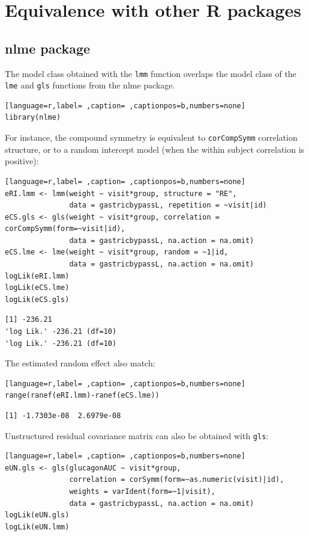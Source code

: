 \documentclass[12pt]{article}
\begin{document}
\clearpage

\section{Equivalence with other R packages}
\label{sec:orgc979ac3}

\subsection{nlme package}
\label{sec:orgd7ba164}

The model class obtained with the \texttt{lmm} function overlaps the model
class of the \texttt{lme} and \texttt{gls} functions from the nlme package.
\begin{lstlisting}[language=r,label= ,caption= ,captionpos=b,numbers=none]
library(nlme)
\end{lstlisting}

For instance, the compound symmetry is equivalent to \texttt{corCompSymm}
correlation structure, or to a random intercept model (when the within
subject correlation is positive):
\begin{lstlisting}[language=r,label= ,caption= ,captionpos=b,numbers=none]
eRI.lmm <- lmm(weight ~ visit*group, structure = "RE",
               data = gastricbypassL, repetition = ~visit|id)
eCS.gls <- gls(weight ~ visit*group, correlation = corCompSymm(form=~visit|id),
               data = gastricbypassL, na.action = na.omit)
eCS.lme <- lme(weight ~ visit*group, random = ~1|id,
               data = gastricbypassL, na.action = na.omit)
logLik(eRI.lmm)
logLik(eCS.lme)
logLik(eCS.gls)
\end{lstlisting}

\begin{verbatim}
[1] -236.21
'log Lik.' -236.21 (df=10)
'log Lik.' -236.21 (df=10)
\end{verbatim}


The estimated random effect also match:
\begin{lstlisting}[language=r,label= ,caption= ,captionpos=b,numbers=none]
range(ranef(eRI.lmm)-ranef(eCS.lme))
\end{lstlisting}

\begin{verbatim}
[1] -1.7303e-08  2.6979e-08
\end{verbatim}


Unstructured residual covariance matrix can also be obtained with
\texttt{gls}:
\begin{lstlisting}[language=r,label= ,caption= ,captionpos=b,numbers=none]
eUN.gls <- gls(glucagonAUC ~ visit*group,
               correlation = corSymm(form=~as.numeric(visit)|id),
               weights = varIdent(form=~1|visit),
               data = gastricbypassL, na.action = na.omit)
logLik(eUN.gls)
logLik(eUN.lmm)
\end{lstlisting}
\end{document}
